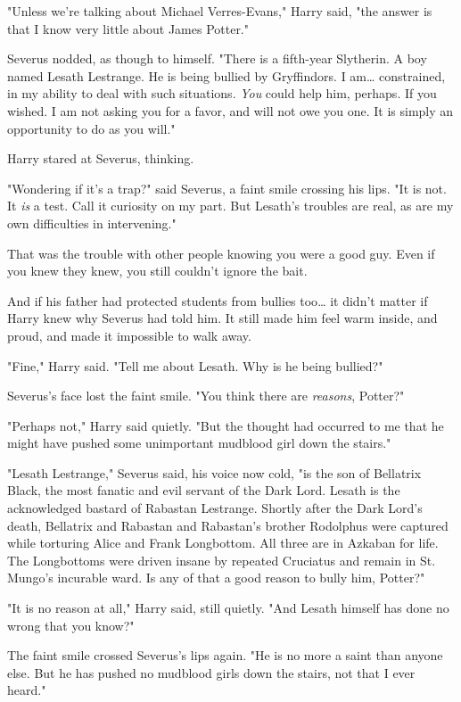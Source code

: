 "Unless we're talking about Michael Verres-Evans," Harry said, "the answer is
that I know very little about James Potter."

Severus nodded, as though to himself. "There is a fifth-year Slytherin. A boy
named Lesath Lestrange. He is being bullied by Gryffindors. I am{\ldots}
constrained, in my ability to deal with such situations. \emph{You} could help
him, perhaps. If you wished. I am not asking you for a favor, and will not owe
you one. It is simply an opportunity to do as you will."

Harry stared at Severus, thinking.

"Wondering if it's a trap?" said Severus, a faint smile crossing his lips. "It
is not. It \emph{is} a test. Call it curiosity on my part. But Lesath's
troubles are real, as are my own difficulties in intervening."

That was the trouble with other people knowing you were a good guy. Even if you
knew they knew, you still couldn't ignore the bait.

And if his father had protected students from bullies too{\ldots} it didn't
matter if Harry knew why Severus had told him. It still made him feel warm
inside, and proud, and made it impossible to walk away.

"Fine," Harry said. "Tell me about Lesath. Why is he being bullied?"

Severus's face lost the faint smile. "You think there are \emph{reasons},
Potter?"

"Perhaps not," Harry said quietly. "But the thought had occurred to me that he
might have pushed some unimportant mudblood girl down the stairs."

"Lesath Lestrange," Severus said, his voice now cold, "is the son of Bellatrix
Black, the most fanatic and evil servant of the Dark Lord. Lesath is the
acknowledged bastard of Rabastan Lestrange. Shortly after the Dark Lord's
death, Bellatrix and Rabastan and Rabastan's brother Rodolphus were captured
while torturing Alice and Frank Longbottom. All three are in Azkaban for life.
The Longbottoms were driven insane by repeated Cruciatus and remain in St.
Mungo's incurable ward. Is any of that a good reason to bully him, Potter?"

"It is no reason at all," Harry said, still quietly. "And Lesath himself has
done no wrong that you know?"

The faint smile crossed Severus's lips again. "He is no more a saint than
anyone else. But he has pushed no mudblood girls down the stairs, not that I
ever heard."

